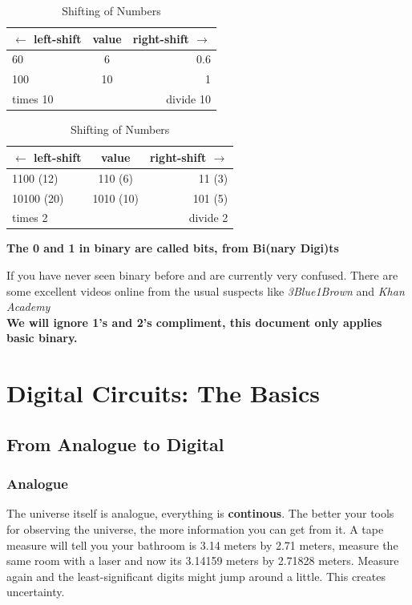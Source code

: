 \documentclass[12pt, a4paper, oneside]{memoir}
\newcommand{\attention}[1]{\begin{center}\colorbox{attention}{\textbf{#1}}\end{center}}
\begin{document}
\begin{table}[h]
  \caption{Shifting of Numbers}
  \centering
  \begin{tabular}{lcr}
  $\leftarrow$ left-shift & value & right-shift $\rightarrow$ \\
  \midrule
  60 & 6 & 0.6 \\
  100 & 10 & 1 \\
  \midrule
  times 10 & & divide 10 \\
  \bottomrule
  \end{tabular}
  \hspace{0.02\textwidth}
  \begin{tabular}{lcr}
    $\leftarrow$ left-shift & value & right-shift $\rightarrow$ \\
    \midrule
    1100 (12) & 110 (6) & 11 (3)\\
    10100 (20) & 1010 (10) & 101 (5) \\
    \midrule
    times 2 & & divide 2 \\
    \bottomrule
  \end{tabular}
\end{table}
\attention{The 0 and 1 in binary are called bits, from Bi(nary Digi)ts}
\noindent
If you have never seen binary before and are currently very confused. 
There are some excellent videos online from the usual suspects like \textit{3Blue1Brown} and \textit{Khan Academy}
\\
\textbf{We will ignore 1's and 2's compliment, this document only applies basic binary.}

\chapter{Digital Circuits: The Basics}

\section{From Analogue to Digital}
\subsection*{Analogue}
The universe itself is analogue, everything is \textbf{continous}. The better your tools for observing the universe, the more information you can get from it.
A tape measure will tell you your bathroom is 3.14 meters by 2.71 meters, measure the same room with a laser and now its 3.14159 meters by 2.71828 meters.
Measure again and the least-significant digits might jump around a little. This creates uncertainty.
\end{document}
